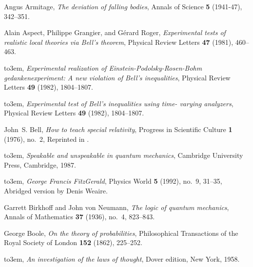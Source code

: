 \documentclass{article}
\begin{document}
%
%
%
%



\providecommand{\bysame}{\leavevmode\hbox to3em{\hrulefill}\thinspace}
\providecommand{\MR}{\relax\ifhmode\unskip\space\fi MR }
\providecommand{\MRhref}[2]{%
  \href{http://www.ams.org/mathscinet-getitem?mr=#1}{#2}
}
\providecommand{\href}[2]{#2}
\begin{thebibliography}{10}

Angus Armitage, \emph{The deviation of falling bodies}, Annals of Science
  \textbf{5} (1941-47), 342--351.

Alain Aspect, Philippe Grangier, and G{\'{e}}rard Roger, \emph{Experimental
  tests of realistic local theories via {B}ell's theorem}, Physical Review
  Letters \textbf{47} (1981), 460--463.

\bysame, \emph{Experimental realization of Einstein-Podolsky-Rosen-Bohm {\it
  gedankenexperiment}: A new violation of {B}ell's inequalities}, Physical
  Review Letters \textbf{49} (1982), 1804--1807.

\bysame, \emph{Experimental test of {B}ell's inequalities using time- varying
  analyzers}, Physical Review Letters \textbf{49} (1982), 1804--1807.

John~S. Bell, \emph{How to teach special relativity}, Progress in Scientific
  Culture \textbf{1} (1976), no.~2, Reprinted in \cite[pp. 67-80]{bell-87}.

\bysame, \emph{Speakable and unspeakable in quantum mechanics}, Cambridge
  University Press, Cambridge, 1987.

\bysame, \emph{{G}eorge {F}rancis {F}itz{G}erald}, Physics World \textbf{5}
  (1992), no.~9, 31--35, Abridged version by Denis Weaire.

Garrett Birkhoff and John von Neumann, \emph{The logic of quantum mechanics},
  Annals of Mathematics \textbf{37} (1936), no.~4, 823--843.

George Boole, \emph{On the theory of probabilities}, Philosophical Transactions
  of the Royal Society of London \textbf{152} (1862), 225--252.

\bysame, \emph{An investigation of the laws of thought}, Dover edition, New
  York, 1958.


\end{thebibliography}
\end{document}
